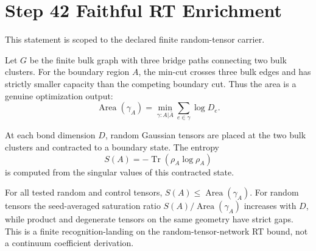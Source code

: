\documentclass[11pt]{article}
\begin{document}
\section*{Step 42 Faithful RT Enrichment}
This statement is scoped to the declared finite random-tensor carrier.

Let \(G\) be the finite bulk graph with three bridge paths connecting two bulk clusters. For the boundary region \(A\), the min-cut crosses three bulk edges and has strictly smaller capacity than the competing boundary cut. Thus the area is a genuine optimization output:
\[
  \operatorname{Area}(\gamma_A)=\min_{\gamma:A|\bar A}\sum_{e\in\gamma}\log D_e.
\]

At each bond dimension \(D\), random Gaussian tensors are placed at the two bulk clusters and contracted to a boundary state. The entropy
\[
  S(A)=-\operatorname{Tr}(\rho_A\log\rho_A)
\]
is computed from the singular values of this contracted state.

For all tested random and control tensors, \(S(A)\le \operatorname{Area}(\gamma_A)\). For random tensors the seed-averaged saturation ratio \(S(A)/\operatorname{Area}(\gamma_A)\) increases with \(D\), while product and degenerate tensors on the same geometry have strict gaps. This is a finite recognition-landing on the random-tensor-network RT bound, not a continuum coefficient derivation.
\end{document}
